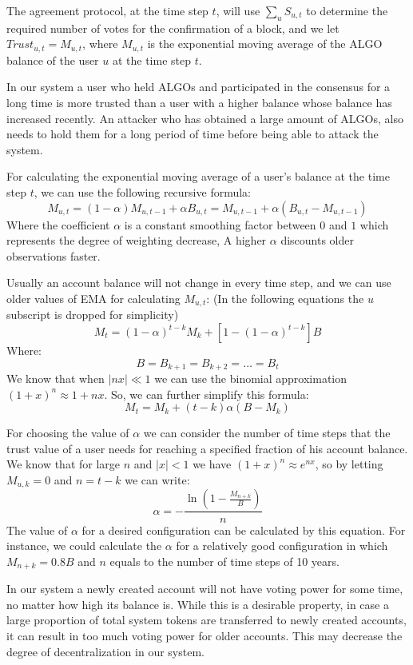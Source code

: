\documentclass[11pt, A4]{report}
\begin{document}
    The agreement protocol, at the time step \(t\), will use \(\sum_{u}S_{u,t}\) to determine the required
    number of votes for the confirmation of a block, and we let \(Trust_{u,t} = M_{u,t}\), where \(M_{u,t}\) is the
    exponential moving average of the ALGO balance of the user \(u\) at the time step \(t\).

    In our system a user who held ALGOs and participated in the consensus for a long time is more trusted
    than a user with a higher balance whose balance has increased recently. An attacker who has obtained a large
    amount of ALGOs, also needs to hold them for a long period of time before being able to attack the system.

    For calculating the exponential moving average of a user's balance at the time step \(t\), we can use the following
    recursive formula:
    \[
        M_{u,t} = (1 - \alpha) M_{u,t-1} + \alpha B_{u,t} = M_{u,t-1} + \alpha (B_{u,t} - M_{u,t-1})
    \]
    Where the coefficient \(\alpha\) is a constant smoothing factor between \(0\) and \(1\) which represents the
    degree of weighting decrease, A higher \(\alpha\) discounts older observations faster.

    Usually an account balance will not change in every time step, and we can use older values of EMA for calculating
    \(M_{u,t}\): (In the following equations the \(u\) subscript is dropped for simplicity)
    \[
        M_{t} = (1 - \alpha)^{t-k}M_{k} + [1 - (1 - \alpha)^{t - k}]B
    \]
    Where:
    \[
        B = B_{k+1} = B_{k+2} = \dots = B_{t}
    \]
    We know that when \(|nx| \ll 1\) we can use the binomial approximation \({(1 + x)^n \approx 1 + nx}\). So, we can
    further simplify this formula:
    \[
        M_{t} = M_{k} + (t - k) \alpha (B - M_{k})
    \]

    For choosing the value of \(\alpha\) we can consider the number of time steps that the trust value of a user needs
    for reaching a specified fraction of his account balance. We know that for large \(n\) and \(|x| < 1\) we have
    \((1 + x)^n \approx e^{nx}\), so by letting \(M_{u,k} = 0\) and \(n = t - k\) we can write:
    \[
        \alpha =- \frac{\ln\left(1 - \frac{M_{n+k}}{B}\right)}{n}
    \]
    The value of \(\alpha\) for a desired configuration can be calculated by this equation. For instance, we could
    calculate the \(\alpha\) for a relatively good configuration in which \(M_{n+k} = 0.8B\) and \(n\) equals to the
    number of time steps of 10 years.

    In our system a newly created account will not have voting power for some time, no matter how high its
    balance is. While this is a desirable property, in case a large proportion of total system tokens are
    transferred to newly created accounts, it can result in too much voting power for older accounts. This may decrease
    the degree of decentralization in our system.
\end{document}
